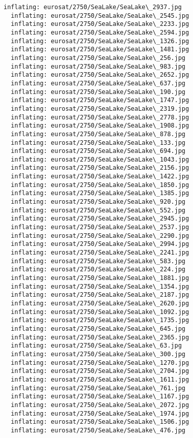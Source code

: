 \documentclass[11pt]{article}
\begin{document}
\begin{Verbatim}[commandchars=\\\{\}]
  inflating: eurosat/2750/SeaLake/SeaLake\_2937.jpg
  inflating: eurosat/2750/SeaLake/SeaLake\_2545.jpg
  inflating: eurosat/2750/SeaLake/SeaLake\_2233.jpg
  inflating: eurosat/2750/SeaLake/SeaLake\_2594.jpg
  inflating: eurosat/2750/SeaLake/SeaLake\_1326.jpg
  inflating: eurosat/2750/SeaLake/SeaLake\_1481.jpg
  inflating: eurosat/2750/SeaLake/SeaLake\_256.jpg
  inflating: eurosat/2750/SeaLake/SeaLake\_983.jpg
  inflating: eurosat/2750/SeaLake/SeaLake\_2652.jpg
  inflating: eurosat/2750/SeaLake/SeaLake\_637.jpg
  inflating: eurosat/2750/SeaLake/SeaLake\_190.jpg
  inflating: eurosat/2750/SeaLake/SeaLake\_1747.jpg
  inflating: eurosat/2750/SeaLake/SeaLake\_2319.jpg
  inflating: eurosat/2750/SeaLake/SeaLake\_2778.jpg
  inflating: eurosat/2750/SeaLake/SeaLake\_1908.jpg
  inflating: eurosat/2750/SeaLake/SeaLake\_878.jpg
  inflating: eurosat/2750/SeaLake/SeaLake\_133.jpg
  inflating: eurosat/2750/SeaLake/SeaLake\_694.jpg
  inflating: eurosat/2750/SeaLake/SeaLake\_1043.jpg
  inflating: eurosat/2750/SeaLake/SeaLake\_2156.jpg
  inflating: eurosat/2750/SeaLake/SeaLake\_1422.jpg
  inflating: eurosat/2750/SeaLake/SeaLake\_1850.jpg
  inflating: eurosat/2750/SeaLake/SeaLake\_1385.jpg
  inflating: eurosat/2750/SeaLake/SeaLake\_920.jpg
  inflating: eurosat/2750/SeaLake/SeaLake\_552.jpg
  inflating: eurosat/2750/SeaLake/SeaLake\_2945.jpg
  inflating: eurosat/2750/SeaLake/SeaLake\_2537.jpg
  inflating: eurosat/2750/SeaLake/SeaLake\_2290.jpg
  inflating: eurosat/2750/SeaLake/SeaLake\_2994.jpg
  inflating: eurosat/2750/SeaLake/SeaLake\_2241.jpg
  inflating: eurosat/2750/SeaLake/SeaLake\_583.jpg
  inflating: eurosat/2750/SeaLake/SeaLake\_224.jpg
  inflating: eurosat/2750/SeaLake/SeaLake\_1881.jpg
  inflating: eurosat/2750/SeaLake/SeaLake\_1354.jpg
  inflating: eurosat/2750/SeaLake/SeaLake\_2187.jpg
  inflating: eurosat/2750/SeaLake/SeaLake\_2620.jpg
  inflating: eurosat/2750/SeaLake/SeaLake\_1092.jpg
  inflating: eurosat/2750/SeaLake/SeaLake\_1735.jpg
  inflating: eurosat/2750/SeaLake/SeaLake\_645.jpg
  inflating: eurosat/2750/SeaLake/SeaLake\_2365.jpg
  inflating: eurosat/2750/SeaLake/SeaLake\_63.jpg
  inflating: eurosat/2750/SeaLake/SeaLake\_300.jpg
  inflating: eurosat/2750/SeaLake/SeaLake\_1270.jpg
  inflating: eurosat/2750/SeaLake/SeaLake\_2704.jpg
  inflating: eurosat/2750/SeaLake/SeaLake\_1611.jpg
  inflating: eurosat/2750/SeaLake/SeaLake\_761.jpg
  inflating: eurosat/2750/SeaLake/SeaLake\_1167.jpg
  inflating: eurosat/2750/SeaLake/SeaLake\_2072.jpg
  inflating: eurosat/2750/SeaLake/SeaLake\_1974.jpg
  inflating: eurosat/2750/SeaLake/SeaLake\_1506.jpg
  inflating: eurosat/2750/SeaLake/SeaLake\_476.jpg

\end{Verbatim}
\end{document}
